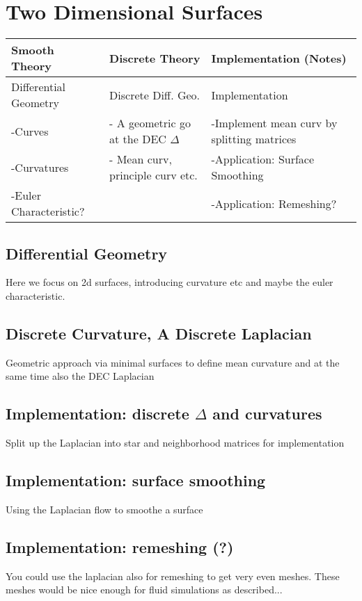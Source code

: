 \documentclass{scrartcl}
\begin{document}
\section{Two Dimensional Surfaces}
	\begin{longtable}{|p{4.5cm}|p{4.5cm}|p{4.5cm}|}
		\hline
		Smooth Theory& Discrete Theory& Implementation (Notes)\\
		\hline
			Differential Geometry & Discrete Diff. Geo. & Implementation\\
			-Curves & - A geometric go at the DEC $\Delta$ & -Implement mean curv by splitting matrices\\
			-Curvatures & - Mean curv, principle curv etc.& -Application: Surface Smoothing\\
			-Euler Characteristic? & & -Application: Remeshing? \\			
		\hline
	\end{longtable}
	\subsection{Differential Geometry}
		Here we focus on 2d surfaces, introducing curvature etc and maybe the euler characteristic.
	\subsection{Discrete Curvature, A Discrete Laplacian}
		Geometric approach via minimal surfaces to define mean curvature and at the same time also the DEC Laplacian
		
	\subsection{Implementation: discrete $\Delta$ and curvatures}
		Split up the Laplacian into star and neighborhood matrices for implementation
	\subsection{Implementation: surface smoothing}
		Using the Laplacian flow to smoothe a surface
	\subsection{Implementation: remeshing (?)}
		You could use the laplacian also for remeshing to get very even meshes. These meshes would be nice enough for fluid simulations as described...
\newpage
\end{document}
